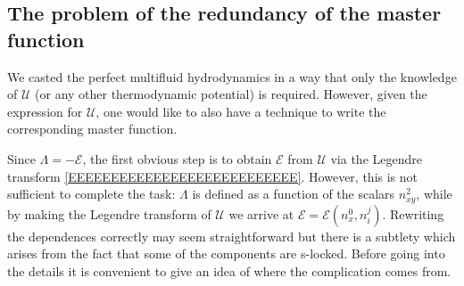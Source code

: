 \documentclass[usenatbib]{mnras}
\begin{document}
%


\subsection{The problem of the redundancy of the master function}

We casted the perfect multifluid hydrodynamics in a way that only the knowledge of  $\mathcal{U}$ (or any other thermodynamic potential) is required. However, given the expression for $\mathcal{U}$, one would like to also have a technique to write the corresponding master function. 

Since $\Lambda=-\mathcal{E}$, the first obvious step is to obtain $\mathcal{E}$ from $\mathcal{U}$ via the Legendre transform \eqref{EEEEEEEEEEEEEEEEEEEEEEEEEEE}. However, this is not sufficient to complete the task:  $\Lambda$ is defined as a function of the scalars $n^2_{xy}$, while by making the Legendre transform of $\mathcal{U}$ we arrive at $\mathcal{E}=\mathcal{E}(n_x^0,n_i^j)$. 
Rewriting the dependences correctly may seem straightforward but there is a subtlety which arises from the fact that some of the components are s-locked. Before going into the details it is convenient to give an idea of where the complication comes from. 
\end{document}
